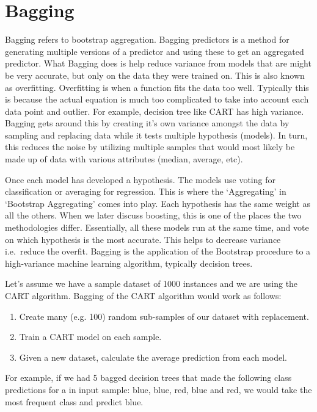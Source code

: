\documentclass{article}
\begin{document}
\section{Bagging}
Bagging refers to bootstrap aggregation. Bagging predictors is a method for generating multiple versions of a predictor and using these to get an aggregated predictor.
What Bagging does is help reduce variance from models that are might be very accurate, but only on the data they were trained on. This is also known as overfitting. Overfitting is when a function fits the data too well. Typically this is because the actual equation is much too complicated to take into account each data point and outlier. For example, decision tree like CART has high variance.
Bagging gets around this by creating it's own variance amongst the data by sampling and replacing data while it tests multiple hypothesis (models). In turn, this reduces the noise by utilizing multiple samples that would most likely be made up of data with various attributes (median, average, etc).

Once each model has developed a hypothesis. The models use voting for classification or averaging for regression. This is where the `Aggregating' in `Bootstrap Aggregating' comes into play. Each hypothesis has the same weight as all the others. When we later discuss boosting, this is one of the places the two methodologies differ.
Essentially, all these models run at the same time, and vote on which hypothesis is the most accurate. This helps to decrease variance i.e.\ reduce the overfit.
Bagging is the application of the Bootstrap procedure to a high-variance machine learning algorithm, typically decision trees.

Let's assume we have a sample dataset of 1000 instances and we are using the CART algorithm. Bagging of the CART algorithm would work as follows:
\begin{enumerate} \addtolength{\itemsep}{-0.5\baselineskip}
\item Create many (e.g. 100) random sub-samples of our dataset with replacement.
\item Train a CART model on each sample.
\item Given a new dataset, calculate the average prediction from each model.
\end{enumerate}
For example, if we had 5 bagged decision trees that made the following class predictions for a in input sample: blue, blue, red, blue and red, we would take the most frequent class and predict blue.
\end{document}
